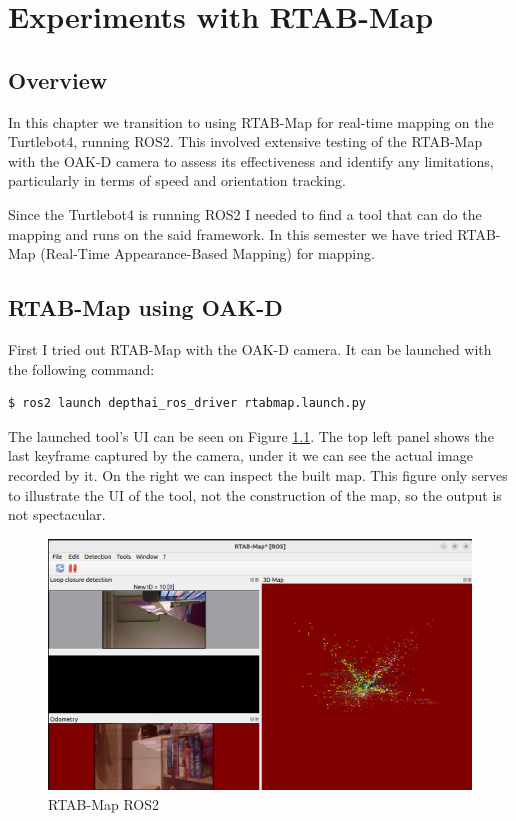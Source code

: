 \chapter{Experiments with RTAB-Map} \label{experiments_rtab_map}

\section{Overview}

In this chapter we transition to using RTAB-Map for real-time mapping on the Turtlebot4, running ROS2. This involved extensive testing of the RTAB-Map with the OAK-D camera to assess its effectiveness and identify any limitations, particularly in terms of speed and orientation tracking.

Since the Turtlebot4 is running ROS2 I needed to find a tool that can do the mapping and runs on the said framework. In this semester we have tried RTAB-Map (Real-Time Appearance-Based Mapping)\cite{RTAB_Map_docs} for mapping.

\section{RTAB-Map using OAK-D}

First I tried out RTAB-Map with the OAK-D camera. It can be launched with the following command:
\FloatBarrier
\begin{lstlisting}[language=bash,frame=single,float=!ht]
$ ros2 launch depthai_ros_driver rtabmap.launch.py
\end{lstlisting}

The launched tool's UI can be seen on Figure \ref{fig:rtabmap_ros}. The top left panel shows the last keyframe captured by the camera, under it we can see the actual image recorded by it. On the right we can inspect the built map. This figure only serves to illustrate the UI of the tool, not the construction of the map, so the output is not spectacular.

\begin{figure}[htbp]
	\centering
	\includegraphics[width=150mm, keepaspectratio]{figures/rtabmap_ros.png}
	\caption{RTAB-Map ROS2}
	\label{fig:rtabmap_ros}
\end{figure}

